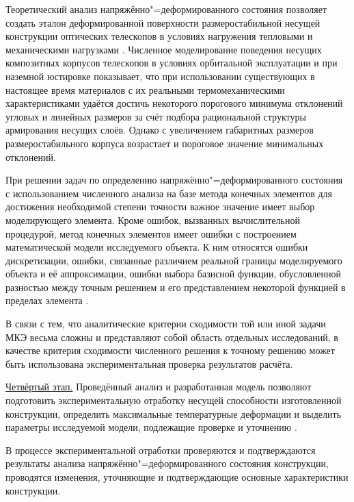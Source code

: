 Теоретический анализ напряжённо"=деформированного состояния позволяет создать эталон деформированной поверхности размеростабильной несущей конструкции оптических телескопов в условиях нагружения тепловыми и механическими нагрузками \cite{bit:bib14}. Численное моделирование поведения несущих композитных корпусов телескопов в условиях орбитальной эксплуатации и при наземной юстировке показывает, что при использовании существующих в настоящее время материалов с их реальными термомеханическими характеристиками удаётся достичь некоторого порогового минимума отклонений угловых и линейных размеров за счёт подбора рациональной структуры армирования несущих слоёв. Однако с увеличением габаритных размеров размеростабильного корпуса возрастает и пороговое значение минимальных отклонений.



При решении задач по определению напряжённо"=деформированного состояния с использованием численного анализа на базе метода конечных элементов для достижения необходимой степени точности важное значение имеет выбор моделирующего элемента. Кроме ошибок, вызванных вычислительной процедурой, метод конечных элементов имеет ошибки с построением математической модели исследуемого объекта. К ним относятся ошибки дискретизации, ошибки, связанные различием реальной границы моделируемого объекта и её аппроксимации, ошибки выбора базисной функции, обусловленной разностью между точным решением и его представлением некоторой функцией в пределах элемента \cite{bit:bib15, bit:bib16}.



В связи с тем, что аналитические критерии сходимости той или иной задачи МКЭ весьма сложны и представляют собой область отдельных исследований, в качестве критерия сходимости численного решения к точному решению может быть использована экспериментальная проверка результатов расчёта.



\underline {Четвёртый этап.} Проведённый анализ и разработанная модель позволяют подготовить экспериментальную отработку несущей способности изготовленной конструкции, определить максимальные температурные деформации и выделить параметры исследуемой модели, подлежащие проверке и уточнению \cite{bit:bib1}.



В процессе экспериментальной отработки проверяются и подтверждаются результаты анализа напряжённо"=деформированного состояния конструкции, проводятся изменения, уточняющие и подтверждающие основные характеристики конструкции.



